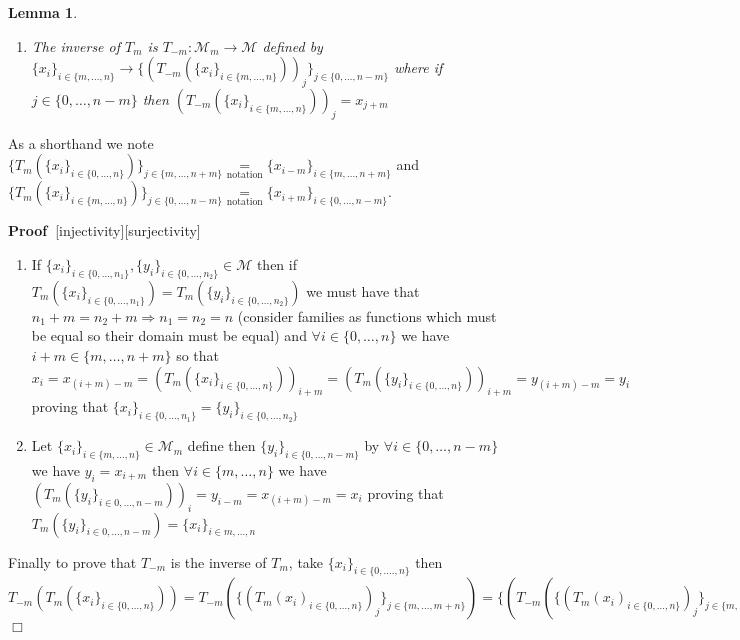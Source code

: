 \documentclass{book}
\newcommand{\equallim}{\mathop{=}\limits}
\newcommand{\tmop}[1]{\ensuremath{\operatorname{#1}}}
\newenvironment{proof}{\noindent\textbf{Proof\ }}{\hspace*{\fill}$\Box$\medskip}
\newtheorem{lemma}{Lemma}
\begin{document}
{{\begin{lemma}
\begin{enumerate}
    \item The inverse of $T_m$ is $T_{- m} : \mathcal{M}_m \rightarrow
    \mathcal{M}$ defined by $\{ x_i \}_{i \in \{ m, \ldots, n \}} \rightarrow
    \{ (T_{- m} (\{ x_i \}_{i \in \{ m, \ldots, n \}}))_j \}_{j \in \{ 0,
    \ldots, n - m \}}$ where if $j \in \{ 0, \ldots, n - m \}$ then $(T_{- m}
    (\{ x_i \}_{i \in \{ m, \ldots, n \}}))_j = x_{j + m}$
  \end{enumerate}
\end{lemma}

As a shorthand we note $\{ T_m (\{ x_i \}_{i \in \{ 0, \ldots, n \}}) \}_{j
\in \{ m, \ldots, n + m \}} \equallim_{\tmop{notation}} \{ x_{i - m} \}_{i \in
\{ m, \ldots, n + m \}}$ and $\{ T_m (\{ x_i \}_{i \in \{ m, \ldots, n \}})
\}_{j \in \{ 0, \ldots, n - m \}} \equallim_{\tmop{notation}} \{ x_{i + m}
\}_{i \in \{ 0, \ldots, n - m \}}$.

\begin{proof}[injectivity][surjectivity]
  
  \begin{enumerate}
    \item If $\{ x_i \}_{i \in \{ 0, \ldots, n_1 \}}, \{ y_i \}_{i \in \{ 0,
    \ldots, n_2 \}} \in \mathcal{M}$ then if $T_m (\{ x_i \}_{i \in \{ 0,
    \ldots, n_1 \}}) = T_m (\{ y_i \}_{i \in \{ 0, \ldots, n_2 \}})$ we must
    have that $n_1 + m = n_2 + m \Rightarrow n_1 = n_2 = n$ (consider families
    as functions which must be equal so their domain must be equal) and
    $\forall i \in \{ 0, \ldots, n \}$ we have $i + m \in \{ m, \ldots, n + m
    \}$ so that $x_i = x_{(i + m) - m} = (T_m (\{ x_i \}_{i \in \{ 0, \ldots,
    n \}}))_{i + m} = (T_m (\{ y_i \}_{i \in \{ 0, \ldots, n \}}))_{i + m} =
    y_{(i + m) - m} = y_i$ proving that $\{ x_i \}_{i \in \{ 0, \ldots, n_1
    \}} = \{ y_i \}_{i \in \{ 0, \ldots, n_2 \}}$
    
    \item  Let $\{ x_i \}_{i \in \{ m, \ldots, n \}} \in \mathcal{M}_m$ define
    then $\{ y_i \}_{i \in \{ 0, \ldots, n - m \}}$ by $\forall i \in \{ 0,
    \ldots, n - m \}$ we have $y_i = x_{i + m}$ then $\forall i \in \{ m,
    \ldots, n \}$ we have $(T_m (\{ y_i \}_{i \in 0, \ldots, n - m}))_i = y_{i
    - m} = x_{(i + m) - m} = x_i$ proving that $T_m (\{ y_i \}_{i \in 0,
    \ldots, n - m}) = \{ x_i \}_{i \in m, \ldots, n}$
  \end{enumerate}
  Finally to prove that $T_{- m}$ is the inverse of $T_m$, take $\{ x_i \}_{i
  \in \{ 0, \ldots ., n \}}$ then $T_{- m} (T_m (\{ x_i \}_{i \in \{ 0,
  \ldots, n \}})) = T_{- m} (\{ (T_m (x_i)_{i \in \{ 0, \ldots, n \}})_j \}_{j
  \in \{ m, \ldots, m + n \}}) = \{ (T_{- m} (\{ (T_m (x_i)_{i \in \{ 0,
  \ldots, n \}})_j \}_{j \in \{ m, \ldots, m + n \}}))_k \}_{k \in \{ 0,
  \ldots, (m + n) - m \}} = \{ (T_{- m} (\{ x_{j - m} \}_{j \in \{ m, \ldots,
  m + n \}}))_k \}_{k \in \{ 0, \ldots, n \}} = \{ x_{(k - m) + m} \}_{k \in
  \{ 0, \ldots, n \}} = \{ x_k \}_{k \in \{ 0, \ldots, k \}}$
\end{proof}

}}
\end{document}
